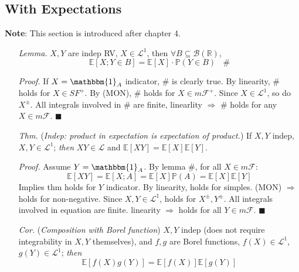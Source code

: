 \documentclass[a4paper,12pt,twoside]{book}
\begin{document}
\subsection{With Expectations}
\textbf{Note}: This section is introduced after chapter 4.
\begin{itemize}
	\item[\textit{Lemma.}] $X,Y$ are indep RV, $X\in \mathcal{L}^1$, then $\forall B \subseteq \mathscr{B}(\mathbb{R})$,
	\begin{equation}
		\mathbb{E}\left[X; Y\in B\right]= \mathbb{E}\left[X\right] \cdot \mathbb{P}\left(Y\in B\right)~~~~\#
	\end{equation}

	\item[\textit{Proof.}] If $X=\mathbbm{1}_{A}$ indicator, \# is clearly true. \newline
	By linearity, \# holds for $X\in SF^+$. \newline
	By (MON), \# holds for $X\in m \mathcal{F}^+$. \newline
	Since $X\in \mathcal{L}^1$, so do $X^{\pm}$. All integrals involved in \# are finite, linearlity $\Rightarrow$ \# holds for any $X\in m \mathcal{F}$. $\blacksquare$

	\item[\textit{Thm.}] (\textit{Indep: product in expectation is expectation of product.}) If $X, Y$ indep, $X,Y \in \mathcal{L}^1$; \textit{then} $XY\in \mathcal{L}$ and $\mathbb{E}\left[XY\right]=\mathbb{E}\left[X\right]\mathbb{E}\left[Y\right]$.

	\item[\textit{Proof.}] Assume $Y= \mathbbm{1}_{A}$. By lemma \#, for all $X\in m \mathcal{F}$:
	\begin{equation}
		\mathbb{E}\left[XY\right] = \mathbb{E}\left[X;A\right]=\mathbb{E}\left[X\right] \mathbb{P}\left(A\right) = \mathbb{E}\left[X\right]\mathbb{E}\left[Y\right]
	\end{equation}
	Implies thm holds for $Y$ indicator. By linearity, holds for simples. \newline
	(MON) $\Rightarrow$ holds for non-negative. \newline
	Since $X, Y \in \mathcal{L}^1$, holds for $X^{\pm}, Y^{\pm}$. All integrals involved in equation are finite. linearity $\Rightarrow$ holds for all $Y\in m \mathcal{F}$. $\blacksquare$

	\item[\textit{Cor.}] (\textit{Composition with Borel function}) $X,Y$ indep (does not require integrability in $X,Y$ themselves), and $f,g$ are Borel functions, $f(X)\in \mathcal{L}^1$, $g(Y) \in \mathcal{L}^1$; \textit{then} 
	\begin{equation}
		\mathbb{E}\left[f(X)g(Y)\right]=\mathbb{E}\left[f(X)\right]\mathbb{E}\left[g(Y)\right]
	\end{equation}


\end{itemize}
\end{document}

